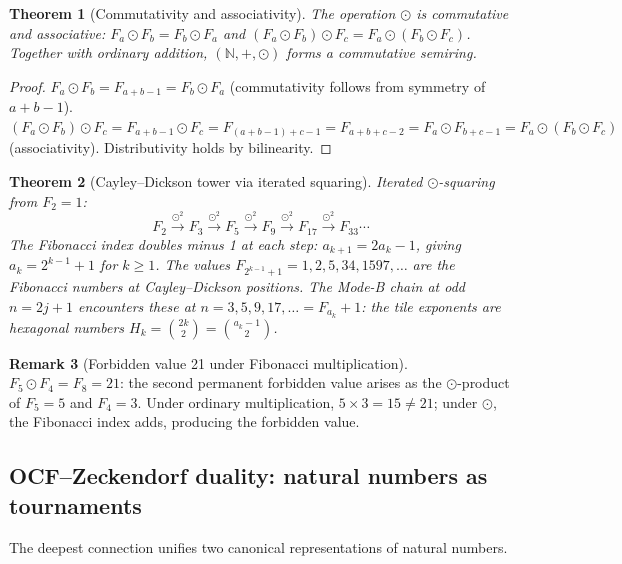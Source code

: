 \documentclass[12pt,reqno]{amsart}
\newtheorem{theorem}{Theorem}[section]
\theoremstyle{definition}
\newtheorem{remark}[theorem]{Remark}
\theoremstyle{plain}
\begin{document}
\begin{theorem}[Commutativity and associativity]\label{thm:fib-ring}
The operation $\odot$ is commutative and associative:
$F_a\odot F_b=F_b\odot F_a$ and $(F_a\odot F_b)\odot F_c=F_a\odot(F_b\odot F_c)$.
Together with ordinary addition, $(\mathbb{N},+,\odot)$ forms a commutative semiring.
\end{theorem}

\begin{proof}
$F_a\odot F_b=F_{a+b-1}=F_b\odot F_a$ (commutativity follows from symmetry of $a+b-1$).
$(F_a\odot F_b)\odot F_c=F_{a+b-1}\odot F_c=F_{(a+b-1)+c-1}=F_{a+b+c-2}=F_a\odot F_{b+c-1}
=F_a\odot(F_b\odot F_c)$ (associativity).  Distributivity holds by bilinearity.
\end{proof}

\begin{theorem}[Cayley--Dickson tower via iterated squaring]\label{thm:cayley-dickson}
Iterated $\odot$-squaring from $F_2=1$:
\[
  F_2\overset{\odot^2}{\longrightarrow}F_3
  \overset{\odot^2}{\longrightarrow}F_5
  \overset{\odot^2}{\longrightarrow}F_9
  \overset{\odot^2}{\longrightarrow}F_{17}
  \overset{\odot^2}{\longrightarrow}F_{33}\cdots
\]
The Fibonacci \emph{index} doubles minus 1 at each step: $a_{k+1}=2a_k-1$,
giving $a_k=2^{k-1}+1$ for $k\ge 1$.
The \emph{values} $F_{2^{k-1}+1}=1,2,5,34,1597,\ldots$ are the Fibonacci numbers
at Cayley--Dickson positions.  The \emph{Mode-B chain} at odd $n=2j+1$
encounters these at $n=3,5,9,17,\ldots=F_{a_k}+1$: the
tile exponents are hexagonal numbers $H_k=\binom{2k}{2}=\binom{a_k-1}{2}$.
\end{theorem}

\begin{remark}[Forbidden value 21 under Fibonacci multiplication]
$F_5\odot F_4=F_8=21$: the second permanent forbidden value arises as the
$\odot$-product of $F_5=5$ and $F_4=3$.  Under ordinary multiplication,
$5\times3=15\ne21$; under $\odot$, the Fibonacci index adds, producing the
forbidden value.
\end{remark}

\subsection{OCF--Zeckendorf duality: natural numbers as tournaments}
\label{ssec:ocf-zeck}

The deepest connection unifies two canonical representations of natural numbers.
\end{document}
